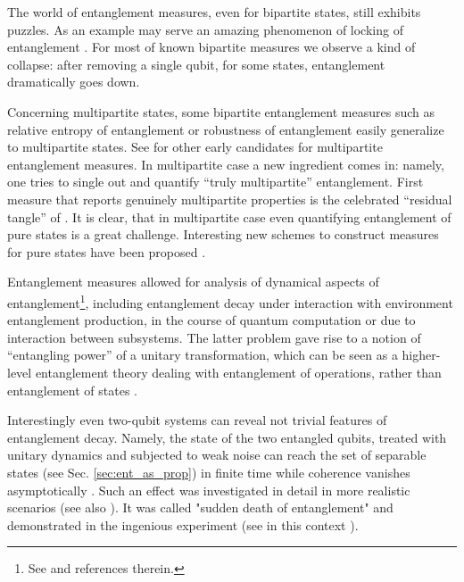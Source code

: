 \documentclass[rmp,12pt,preprint]{revtex4-2}
\begin{document}
The world of entanglement measures, even for bipartite states, still
exhibits puzzles. As an example may serve an amazing phenomenon of
locking of entanglement \cite{lock-ent}. For most of known bipartite
measures we observe a kind of collapse: after removing a single qubit,
for some states, entanglement dramatically goes down.

Concerning multipartite states, some bipartite entanglement measures
such as relative entropy of entanglement or robustness of entanglement
\cite{VidalT1998-robustness} easily generalize to multipartite
states. See \cite{EisertB2000-Schmidt,BarnumL2001-multi} for other
early candidates for multipartite entanglement measures.  In
multipartite case a new ingredient comes in: namely, one tries to
single out and quantify ``truly multipartite'' entanglement.  First
measure that reports genuinely multipartite properties is the
celebrated ``residual tangle'' of \cite{CoffmanKW-tangle}.  It is
clear, that in multipartite case even quantifying entanglement of pure
states is a great challenge. Interesting new schemes to construct
measures for pure states have been proposed
\cite{VerstraeteDM2001-normal,Miyake2002-hyper}.

Entanglement measures allowed for analysis of dynamical aspects of
entanglement\footnote{See \cite {AmicoFOV2007,Yu-Eberly05} and references therein.}, including entanglement decay under interaction with environment
\cite{ZyczkowskiHHH2000-dynamics,FicekT2006,Miranowicz2,EberlyY1,JakobczykJ2004,CarvalhoMPB2005_ent_decoh,DoddH2004,WangBPS2006,Montangero2004,Ban2006,ShrestaADH2005,MintertCKB2005-review,KimLAK2002,YiS1999,MaloyerK2006}
entanglement production, in the course of quantum computation
\cite{ParkerPlenio,KendonMunro} or due to interaction between
subsystems. The latter problem gave rise to a notion of ``entangling
power'' \cite{ZanardiZF2000-entpower,LindenSW2005-entpower} of a
unitary transformation, which can be seen as a higher-level
entanglement theory dealing with entanglement of operations, rather
than entanglement of states
\cite{EJPP02,LindenSW2005-entpower,CLP00,HarrowShor2005}.


Interestingly even two-qubit systems can reveal not trivial features of entanglement decay. Namely, the state of the two entangled qubits, treated with unitary dynamics and subjected to weak noise can reach the set of separable states (see Sec. \ref{sec:ent_as_prop}) in finite time while coherence vanishes asymptotically \cite{ZyczkowskiHHH2000-dynamics}. Such an effect was investigated in detail in more realistic scenarios \cite {FicekT2006,EberlyY1,JakobczykJ2004,DoddH2004,WangBPS2006,YuE2007,TolkunovPA2005,LastraRLSR2007,VaglicaV2007} (see also \cite{JordanSS-ent-change2007}). It was  called "sudden death of entanglement" \cite {EberlyY2} and demonstrated in the ingenious experiment \cite {AlmeidaMHSWRD2007} (see in this context \cite {SantosMDZ2006}).
\end{document}
